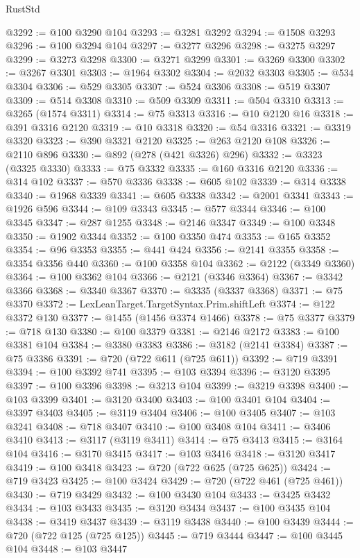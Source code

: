 \begin{lexlean}{RustStd}
\begin{coremodule}
@3292 := @100 @3290 @104
@3293 := @3281 @3292
@3294 := @1508 @3293
@3296 := @100 @3294 @104
@3297 := @3277 @3296
@3298 := @3275 @3297
@3299 := @3273 @3298
@3300 := @3271 @3299
@3301 := @3269 @3300
@3302 := @3267 @3301
@3303 := @1964 @3302
@3304 := @2032 @3303
@3305 := @534 @3304
@3306 := @529 @3305
@3307 := @524 @3306
@3308 := @519 @3307
@3309 := @514 @3308
@3310 := @509 @3309
@3311 := @504 @3310
@3313 := @3265 (@1574 @3311)
@3314 := @75 @3313
@3316 := @10 @2120 @16
@3318 := @391 @3316 @2120
@3319 := @10 @3318
@3320 := @54 @3316
@3321 := @3319 @3320
@3323 := @390 @3321 @2120
@3325 := @263 @2120 @108
@3326 := @2110 @896
@3330 := @892 (@278 (@421 @3326) @296)
@3332 := @3323 (@3325 @3330)
@3333 := @75 @3332
@3335 := @160 @3316 @2120
@3336 := @314 @102
@3337 := @570 @3336
@3338 := @605 @102
@3339 := @314 @3338
@3340 := @1968 @3339
@3341 := @605 @3338
@3342 := @2001 @3341
@3343 := @1926 @596
@3344 := @109 @3343
@3345 := @577 @3344
@3346 := @100 @3345
@3347 := @287 @1255
@3348 := @2146 @3347
@3349 := @100 @3348
@3350 := @1902 @3344
@3352 := @100 @3350 @474
@3353 := @165 @3352
@3354 := @96 @3353
@3355 := @441 @424
@3356 := @2141 @3355
@3358 := @3354 @3356 @440
@3360 := @100 @3358 @104
@3362 := @2122 (@3349 @3360)
@3364 := @100 @3362 @104
@3366 := @2121 (@3346 @3364)
@3367 := @3342 @3366
@3368 := @3340 @3367
@3370 := @3335 (@3337 @3368)
@3371 := @75 @3370
@3372 := LexLeanTarget.TargetSyntax.Prim.shiftLeft
@3374 := @122 @3372 @130
@3377 := @1455 (@1456 @3374 @1466)
@3378 := @75 @3377
@3379 := @718 @130
@3380 := @100 @3379
@3381 := @2146 @2172
@3383 := @100 @3381 @104
@3384 := @3380 @3383
@3386 := @3182 (@2141 @3384)
@3387 := @75 @3386
@3391 := @720 (@722 @611 (@725 @611))
@3392 := @719 @3391
@3394 := @100 @3392 @741
@3395 := @103 @3394
@3396 := @3120 @3395
@3397 := @100 @3396
@3398 := @3213 @104
@3399 := @3219 @3398
@3400 := @103 @3399
@3401 := @3120 @3400
@3403 := @100 @3401 @104
@3404 := @3397 @3403
@3405 := @3119 @3404
@3406 := @100 @3405
@3407 := @103 @3241
@3408 := @718 @3407
@3410 := @100 @3408 @104
@3411 := @3406 @3410
@3413 := @3117 (@3119 @3411)
@3414 := @75 @3413
@3415 := @3164 @104
@3416 := @3170 @3415
@3417 := @103 @3416
@3418 := @3120 @3417
@3419 := @100 @3418
@3423 := @720 (@722 @625 (@725 @625))
@3424 := @719 @3423
@3425 := @100 @3424
@3429 := @720 (@722 @461 (@725 @461))
@3430 := @719 @3429
@3432 := @100 @3430 @104
@3433 := @3425 @3432
@3434 := @103 @3433
@3435 := @3120 @3434
@3437 := @100 @3435 @104
@3438 := @3419 @3437
@3439 := @3119 @3438
@3440 := @100 @3439
@3444 := @720 (@722 @125 (@725 @125))
@3445 := @719 @3444
@3447 := @100 @3445 @104
@3448 := @103 @3447

\end{coremodule}
\end{lexlean}
